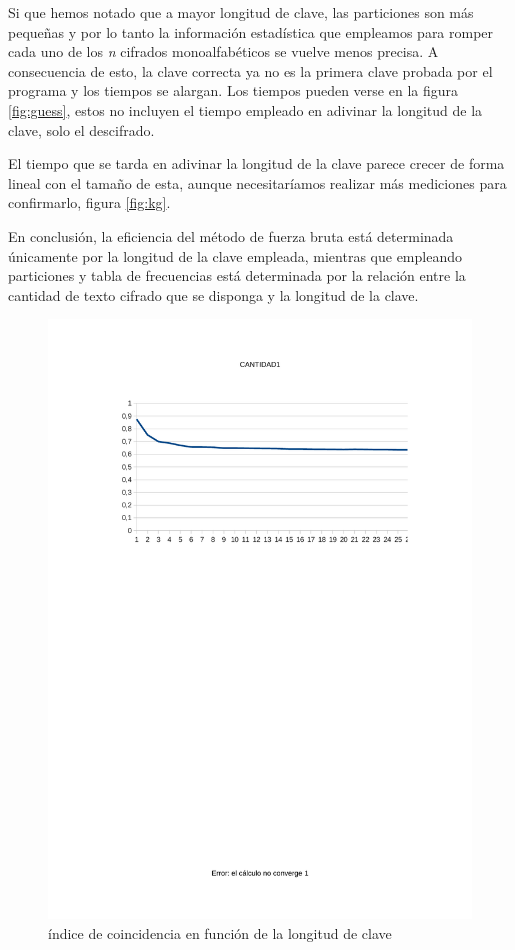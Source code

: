 \documentclass[12pt]{report}
\begin{document}
Si que hemos notado que a mayor longitud de clave, las particiones son más pequeñas y por lo tanto la información estadística que empleamos para romper cada uno de los \textit{n} cifrados monoalfabéticos se vuelve menos precisa. A consecuencia de esto, la clave correcta ya no es la primera clave probada por el programa y los tiempos se alargan. Los tiempos pueden verse en la figura \ref{fig:guess}, estos no incluyen el tiempo empleado en adivinar la longitud de la clave, solo el descifrado.

El tiempo que se tarda en adivinar la longitud de la clave parece crecer de forma lineal con el tamaño de esta, aunque necesitaríamos realizar más mediciones para confirmarlo, figura \ref{fig:kg}.

En conclusión, la eficiencia del método de fuerza bruta está determinada únicamente por la longitud de la clave empleada, mientras que 
empleando particiones y tabla de frecuencias está determinada por la relación entre la cantidad de texto cifrado que se disponga
y la longitud de la clave.

\begin{figure}
\includegraphics[width=1\textwidth]{img/ic.pdf}
\caption{índice de coincidencia en función de la longitud de clave}
\label{fig:ic}
\end{figure}
\end{document}
